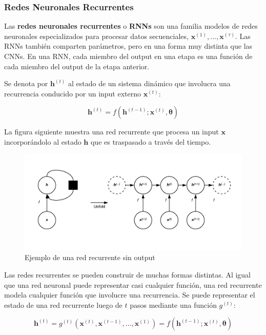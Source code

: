 \subsubsection{Redes Neuronales Recurrentes}

Las \textbf{redes neuronales recurrentes} o \textbf{RNNs} son una familia modelos de redes neuronales especializados para procesar datos secuenciales, $\bm{x}^{(1)},...,\bm{x}^{(\tau)}$. Las RNNs tambi\'en comparten par\'ametros, pero en una forma muy distinta que las CNNs. En una RNN, cada miembro del output en una etapa es una funci\'on de cada miembro del output de la etapa anterior.

Se denota por $\bm{h}^{(t)}$ al estado de un sistema din\'amico que involucra una recurrencia conducido por un input externo $\bm{x}^{(t)}$:

\begin{equation}
\bm{h}^{(t)} = f(\bm{h}^{(t-1)}; \bm{x}^{(t)}, \bm{\theta})
\end{equation}

La figura siguiente muestra una red recurrente que procesa un input $\bm{x}$ incorpor\'andolo al estado $\bm{h}$ que es traspasado a trav\'es del tiempo.

\begin{figure}[H]
\captionsetup{font=small,labelfont=small}
\caption{Ejemplo de una red recurrente sin output}
\centering
\includegraphics[scale=.5]{img/RNN1.png}
\end{figure}

Las redes recurrentes se pueden construir de muchas formas distintas. Al igual que una red neuronal puede representar casi cualquier funci\'on, una red recurrente modela cualquier funci\'on que involucre una recurrencia. Se puede representar el estado de una red recurrente luego de $t$ pasos mediante una funci\'on $g^{(t)}$:

\begin{equation}
\bm{h}^{(t)} = g^{(t)}(\bm{x}^{(t)},\bm{x}^{(t-1)},...,\bm{x}^{(1)}) =  f(\bm{h}^{(t-1)}; \bm{x}^{(t)}, \bm{\theta})
\end{equation}


